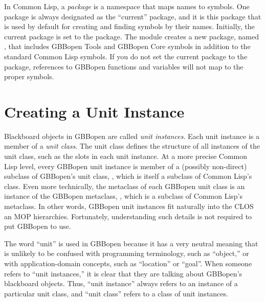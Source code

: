 \documentclass[10pt,twoside,english,pdftex]{article}
\begin{document}
In Common Lisp, a \textit{package\/} is a namespace that maps names to
symbols.  One package is always designated as the ``current'' package, and it
is this package that is used by default for creating and finding symbols by
their names.  Initially, the current package is set to the
 package.  The  module creates a
new package, named , that includes GBBopen Tools and
GBBopen Core symbols in addition to the standard Common Lisp symbols.  If you
do not set the current package to the  package, references
to GBBopen functions and variables will not map to the proper symbols.


\T\markright{}%
\T\pagestyle{plain}
\T\cleardoublepage
\W{}
\T\pagestyle{fancy}
\T\thispagestyle{fancybottom}
\T\renewcommand{\headrulewidth}{0pt}
\section{Creating a Unit Instance}
\label{sec:unit-instance}%

Blackboard objects in GBBopen are called \textit{unit instances}. Each unit
instance is a member of a \textit{unit class}.  The unit class defines the
structure of all instances of the unit class, such as the slots in each unit
instance.  At a more precise Common Lisp level, every GBBopen unit instance is
member of a (possibly non-direct) subclass of GBBopen's unit class,
, which is itself a subclass of Common Lisp's
 class.  Even more technically, the metaclass of each
GBBopen unit class is an instance of the GBBopen metaclass,
, which is a subclass of Common Lisp's
 metaclass.  In other words, GBBopen unit instances fit
naturally into the CLOS an MOP hierarchies. Fortunately, understanding such
details is not required to put GBBopen to use.

The word ``unit'' is used in GBBopen because it has a very neutral meaning
that is unlikely to be confused with programming terminology, such as
``object,'' or with application-domain concepts, such as ``location'' or
``goal''.  When someone refers to ``unit instances,'' it is clear that they
are talking about GBBopen's blackboard objects.  Thus, ``unit instance''
always refers to an instance of a particular unit class, and ``unit class''
refers to a class of unit instances.
\end{document}

